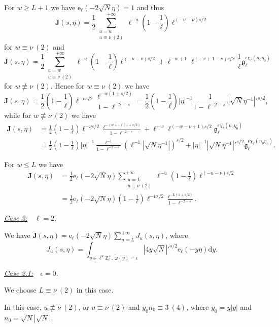 \documentclass[10pt,oneside,reqno]{amsart}
\makeatletter
\newcommand\rmd{\mathrm{d}}
\newcommand\rme{\mathrm{e}}
\newcommand\bJ{\mathbf{J}}
\newcommand\ZZ{\mathbb{Z}}
\newcommand\mf[1]{\mathfrak{#1}}
\renewcommand\leq{\leqslant}
\renewcommand\geq{\geqslant}
\theoremstyle{THEOREM}
\theoremstyle{DEFINITION}
\theoremstyle{EXERCISE}
\numberwithin{equation}{section}
\renewenvironment{proof}[1][\proofname]{\par
  \vspace{-6pt}
  \pushQED{\qed}
  \normalfont \topsep6\p@\@plus6\p@\relax
  \trivlist
  \item[\hskip\labelsep\rmfamily\bfseries
    #1\@addpunct{:}]\ignorespaces
}{
  \popQED\endtrivlist\@endpefalse
  \vspace{-6pt}
}
\makeatother
\begin{document}
\begin{proof}
For $w\geq L+1$ we have $\rme_\ell(-2\sqrt{N}\eta)=1$ and thus
\[
\bJ(s,\eta)=\frac{1}{2}\sum_{\substack{u=w\\u\equiv \nu \ (2)}}^{+\infty}\ell^{-u}\left(1-\frac{1}{\ell}\right)\ell^{(-u-\nu)s/2}
\]
for $w\equiv \nu\ (2)$ and
\[
\bJ(s,\eta)=\frac{1}{2}\sum_{\substack{u=w\\u\equiv \nu \ (2)}}^{+\infty}\ell^{-u}\left(1-\frac{1}{\ell}\right)\ell^{(-u-\nu)s/2}+\ell^{-w+1}\ell^{(-w+1-\nu)s/2} \frac{1}{\ell}\mf{g}_\ell^{\epsilon\chi_\ell(n_0\eta_0)}
\]
for $w\not\equiv \nu\ (2)$. Hence for $w\equiv \nu\ (2)$ we have
\[
\bJ(s,\eta)=\frac{1}{2}\left(1-\frac{1}{\ell}\right)\ell^{-\nu s/2}\frac{\ell^{-w(1+s/2)}}{1-\ell^{-2-s}}=\frac{1}{2}\left(1-\frac{1}{\ell}\right)|\eta|^{-1} \frac{1}{1-\ell^{-2-s}}|\sqrt{N}\eta^{-1}|'^{s/2},
\]
while for $w\not\equiv \nu\ (2)$ we have
\begin{align*}
   \bJ(s,\eta) & =\frac{1}{2}\left(1-\frac{1}{\ell}\right)\ell^{-\nu s/2}\frac{\ell^{-(w+1)(1+s/2)}}{1-\ell^{-2-s}}+\ell^{-w}\ell^{(-w-\nu+1)s/2}\mf{g}_\ell^{\epsilon\chi_\ell(n_0\eta_0)}\\
     & =\frac{1}{2}\left(1-\frac{1}{\ell}\right)|\eta|^{-1} \frac{\ell^{-1}}{1-\ell^{-2-s}}(\ell^{-1}|\sqrt{N}\eta^{-1}|)^{s/2}+|\eta|^{-1} |\sqrt{N}\eta^{-1}|'^{s/2}\mf{g}_\ell^{\epsilon\chi_\ell(n_0\eta_0)}.
\end{align*}

For $w\leq L$ we have
\begin{align*}
   \bJ(s,\eta) & =\frac{1}{2}\rme_\ell(-2\sqrt{N}\eta)\sum_{\substack{u=L\\u\equiv \nu \ (2)}}^{+\infty}\ell^{-u}\left(1-\frac{1}{\ell}\right)\ell^{(-u-\nu)s/2} \\
     & =\frac{1}{2}\rme_\ell(-2\sqrt{N}\eta)\left(1-\frac{1}{\ell}\right)\ell^{-\nu s/2}\frac{\ell^{-L(1+s/2)}}{1-\ell^{-2-s}}.
\end{align*}

\underline{\emph{Case 2:}}\ \ $\ell= 2$.

We have $\bJ(s,\eta)=\rme_\ell(-2\sqrt{N}\eta)\sum_{u=L}^{+\infty}J_{u}(s,\eta)$, where
\[
J_u(s,\eta)=\int_{y\in\ell^u\ZZ_\ell^\times,\ \widetilde{\omega}(y)=\epsilon}|4y\sqrt{N}|'^{s/2}\rme_\ell(-y\eta)\rmd y.
\]

\underline{\emph{Case 2.1:}}\ \ $\epsilon=0$. 

We choose $L\equiv \nu \ (2)$ in this case.

In this case, $u\not\equiv \nu\ (2)$, or $u\equiv \nu\ (2)$ and $y_0n_0\equiv 3\ (4)$, where $y_0=y|y|$ and $n_0=\sqrt{N}|\sqrt{N}|$. 


\end{proof}
\end{document}
